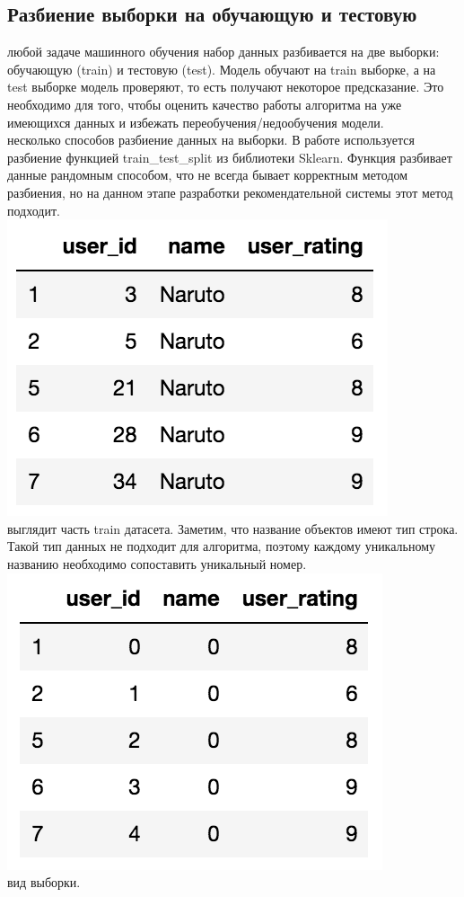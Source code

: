 \documentclass{article}
\newcommand\tab[1][1cm]{\hspace*{#1}}
\begin{document}
\subsection{Разбиение выборки на обучающую и тестовую}
 любой задаче машинного обучения набор данных разбивается на две выборки: обучающую (train) и тестовую (test). Модель обучают на train выборке, а на test выборке модель проверяют, то есть получают некоторое предсказание. Это необходимо для того, чтобы оценить качество работы алгоритма на уже имеющихся данных и избежать переобучения/недообучения модели. \\
 несколько способов разбиение данных на выборки. В работе используется разбиение функцией train\_test\_split из библиотеки Sklearn. Функция разбивает данные рандомным способом, что не всегда бывает корректным методом разбиения, но на данном этапе разработки рекомендательной системы этот метод подходит.\\
\tab\includegraphics[scale=0.6]{f9.png}\\
 выглядит часть train датасета. Заметим, что название объектов имеют тип строка. Такой тип данных не подходит для алгоритма, поэтому каждому уникальному названию необходимо сопоставить уникальный номер.
\tab\includegraphics[scale=0.6]{f10.png}\\
 вид выборки.
\end{document}
